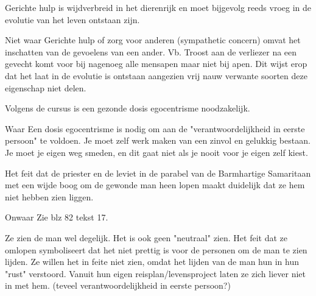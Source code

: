 \documentclass[main.tex]{subfiles}
\begin{document}
\begin{examenvraag}
    \begin{stelling}
        Gerichte hulp is wijdverbreid in het dierenrijk en moet bijgevolg reeds vroeg in de evolutie van het leven ontstaan zijn.
    \end{stelling}

    \begin{stelling-antwoord}{Niet waar}
	Gerichte hulp of zorg voor anderen‭ (‬sympathetic concern‭) ‬omvat het inschatten van de gevoelens 
	van een ander.‭ ‬Vb.‭ ‬Troost aan de verliezer na een gevecht komt voor bij nagenoeg alle mensapen 
	maar niet bij apen.‭ ‬Dit wijst erop dat het laat in de evolutie is ontstaan aangezien vrij nauw 
	verwante soorten deze eigenschap niet delen.
    \end{stelling-antwoord}
\end{examenvraag}


\begin{examenvraag}
    \begin{stelling}
        Volgens de cursus is een gezonde dosis egocentrisme noodzakelijk.
    \end{stelling}

	 \begin{stelling-antwoord}{Waar}
        Een dosis egocentrisme is nodig om aan de "verantwoordelijkheid in eerste persoon" te voldoen. 
        Je moet zelf werk maken van een zinvol en gelukkig bestaan. 
        Je moet je eigen weg smeden, en dit gaat niet als je nooit voor je eigen zelf kiest.
    \end{stelling-antwoord}
\end{examenvraag}


\begin{examenvraag}
    \begin{stelling}
        Het feit dat de priester en de leviet in de parabel van de Barmhartige Samaritaan met een wijde boog om de gewonde man heen lopen maakt duidelijk dat ze hem niet hebben zien liggen.
    \end{stelling}

	 \begin{stelling-antwoord}{Onwaar}
	   Zie blz 82 tekst 17.
	   
	   Ze zien de man wel degelijk. 
	   Het is ook geen "neutraal" zien.
	   Het feit dat ze omlopen symboliseert dat het niet prettig is voor de personen om de man te zien lijden.
	   Ze willen het in feite niet zien, omdat het lijden van de man hun in hun "rust" verstoord. 
	   Vanuit hun eigen reisplan/levensproject laten ze zich liever niet in met hem. 
	   (teveel verantwoordelijkheid in eerste persoon?)
	 
    \end{stelling-antwoord}
\end{examenvraag}
\end{document}
